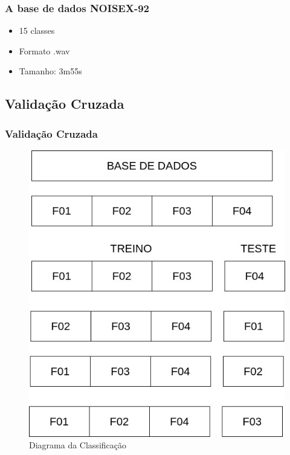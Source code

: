 \documentclass{beamer}
\begin{document}
\begin{frame}
    \frametitle{A base de dados NOISEX-92}
    
    \begin{itemize}
    	\setlength\itemsep{1em}
        \item 15 classes
    	\item Formato .wav
        \item Tamanho: 3m55s
	\end{itemize}
    
    \begin{table}[ht]
	\centering
	\caption{Classes na base de dados NOISEX.}
	\label{tab:noisex}
\end{table}
    
    
\end{frame}

\subsection{Validação Cruzada}

\begin{frame}
	\frametitle{Validação Cruzada}
	
	\begin{figure}[ht]
    	\centering
		\includegraphics[width=.4\textwidth]{crossvalid.jpg}
		\caption{Diagrama da Classificação}
		\label{fig:diagclass}
	\end{figure}
    
\end{frame}
\end{document}
